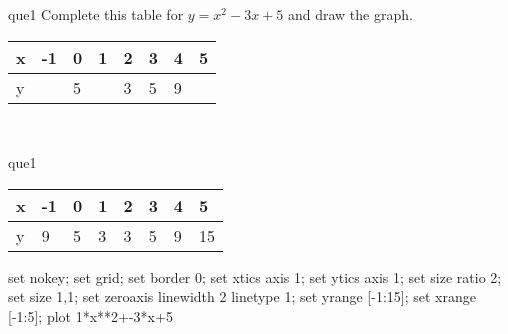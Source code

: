 \documentclass[13.5pt, varwidth=true]{beamer}
\begin{document}
\begin{frame}[shrink=19,fragile]
	\begin{beamercolorbox}[rounded=true, left, shadow=true,wd=14.8cm]{que1}
		 Complete this table for $y = x^{2} - 3x + 5$ and draw the graph. \\[0.3cm] \renewcommand{\arraystretch}{1.2}\begin{tabular}{|C|C|C|C|C|C|C|C|} \hline x & -1 & 0 & 1 & 2 & 3 & 4 & 5 \\ \hline y &  & 5 &  & 3 & 5 & 9 & \\ \hline \end{tabular}\\[0.3cm]
	\end{beamercolorbox}
\end{frame}
\begin{frame}[shrink=19,fragile]
	\begin{beamercolorbox}[rounded=true, left, shadow=true,wd=14.8cm]{que1}
		\renewcommand{\arraystretch}{1.2}\begin{tabular}{|C|C|C|C|C|C|C|C|} \hline x & -1 & 0 & 1 & 2 & 3 & 4 & 5 \\ \hline y & 9 & 5 & 3 & 3 & 5 & 9 & 15\\ \hline \end{tabular}\begin{gnuplot}[terminal=pdf] set nokey; set grid; set border 0; set xtics axis 1; set ytics axis 1; set size ratio 2; set size 1,1; set zeroaxis linewidth 2 linetype 1; set yrange [-1:15]; set xrange [-1:5]; plot 1*x**2+-3*x+5 \end{gnuplot}
	\end{beamercolorbox}
\end{frame}
\end{document}
